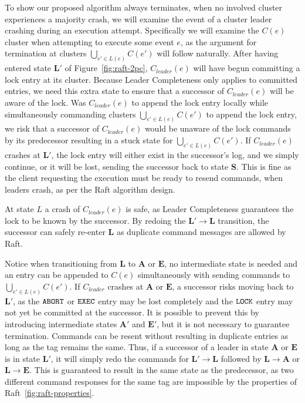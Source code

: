 \documentclass{article}
\begin{document}
	To show our proposed algorithm always terminates, when no involved cluster experiences a majority crash, we will examine the event of a cluster leader crashing during an execution attempt.
	Specifically we will examine the $C(e)$ cluster when attempting to execute some event $e$, as the argument for termination at clusters $\bigcup_{e' \in L(e)} C(e')$ will follow naturally.
	After having entered state $\bm{L}'$ of Figure~\ref{fig:raft-2pc}, $C_{leader}(e)$ will have begun committing a lock entry at its cluster. Because Leader Completeness only applies to committed entries, we need this extra state to ensure that a successor of $C_{leader}(e)$ will be aware of the lock.
	Was $C_{leader}(e)$ to append the lock entry locally while simultaneously commanding clusters $\bigcup_{e' \in L(e)} C(e')$ to append the lock entry, we risk that a successor of $C_{leader}(e)$ would be unaware of the lock commands by its predecessor resulting in a stuck state for $\bigcup_{e' \in L(e)} C(e')$.
	If $C_{leader}(e)$ crashes at $\bm{L}'$, the lock entry will either exist in the successor's log, and we simply continue, or it will be lost, sending the successor back to state $\bm{S}$.
	This is fine as the client requesting the execution must be ready to resend commands, when leaders crash, as per the Raft algorithm design.

	At state $L$ a crash of $C_{leader}(e)$ is safe, as Leader Completeness guarantees the lock to be known by the successor.
	By redoing the $\bm{L}' \rightarrow \bm{L}$ transition, the successor can safely re-enter $\bm{L}$ as duplicate command messages are allowed by Raft.

	Notice when transitioning from $\bm{L}$ to $\bm{A}$ or $\bm{E}$, no intermediate state is needed and an entry can be appended to $C(e)$ simultaneously with sending commands to $\bigcup_{e' \in L(e)} C(e')$.
	If $C_{leader}$ crashes at $\bm{A}$ or $\bm{E}$, a successor risks moving back to $\bm{L}'$, as the $\texttt{ABORT}$ or $\texttt{EXEC}$ entry may be lost completely and the $\texttt{LOCK}$ entry may not yet be committed at the successor.
	It is possible to prevent this by introducing intermediate states $\bm{A}'$ and $\bm{E}'$, but it is not necessary to guarantee termination.
	Commands can be resent without resulting in duplicate entries as long as the tag remains the same.
	Thus, if a successor of a leader in state $\bm{A}$ or $\bm{E}$ is in state $\bm{L}'$, it will simply redo the commands for $\bm{L'} \rightarrow \bm{L}$ followed by $\bm{L} \rightarrow \bm{A}$ or $\bm{L} \rightarrow \bm{E}$.
	This is guaranteed to result in the same state as the predecessor, as two different command responses for the same tag are impossible by the properties of Raft~\ref{fig:raft-properties}.
\end{document}
